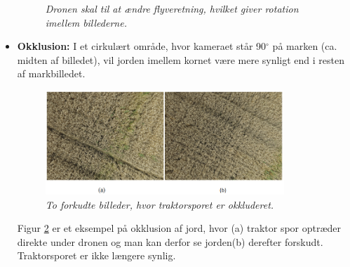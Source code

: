 \begin{itemize}
{\begin{figure}[H]
     \vspace{-1em}
    \begin{center} 
       \caption{{\footnotesize \textit{Dronen skal til at ændre flyveretning, hvilket giver rotation imellem billederne.}}}
    \label{fig:rotation}
     \end{center}
     \vspace{-2.5em}
  \end{figure} \noindent}
\item{\textbf{Okklusion:}
I et cirkulært område, hvor kameraet står 90$^{\circ}$ på marken (ca. midten af billedet), vil jorden imellem kornet være mere synligt end i resten af markbilledet.
\begin{figure}[H]
    \centering
    \includegraphics[width=0.85\textwidth]{fig/18.png}
     \vspace{-1em}
    \begin{center}    
       \caption{{\footnotesize \textit{ To forkudte billeder, hvor traktorsporet er okkluderet. }}}
    \label{fig:okklusion}
     \end{center}
     \vspace{-2.5em}
  \end{figure} \noindent
Figur \ref{fig:okklusion} er et eksempel på okklusion af jord, hvor (a) traktor spor optræder direkte under dronen og man kan derfor se jorden(b) derefter forskudt. Traktorsporet er ikke længere synlig.}
\end{itemize}
